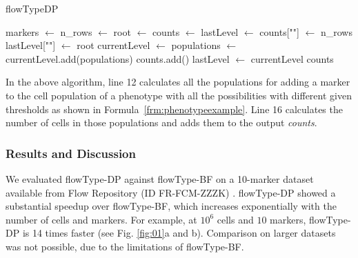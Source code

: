 \begin{algorithm}
\caption{flowTypeDP}
\label{fig:flowtypedpalg}
\begin{algorithmic}[1]
    \State markers $ \gets $ 
    \State n\_rows $ \gets $ 
    \State root $ \gets $ 
    \State counts $ \gets $ lastLevel $ \gets $ 
    \State counts[""] $ \gets $ n\_rows
    \State lastLevel[""] $ \gets $ root
        \State currentLevel $ \gets $ 
                \State populations $ \gets $ 
                \State currentLevel.add(populations)
            \EndFor
        \EndFor
        \State counts.add()
        \State lastLevel $ \gets $ currentLevel
    \EndFor
    \State \Return counts
\EndFunction
\end{algorithmic}
\end{algorithm}

In the above algorithm, line 12 calculates all the populations for adding a
marker to the cell population of a phenotype with all the possibilities with
different given thresholds as shown in Formula~\ref{frm:phenotypeexample}.
Line 16 calculates the number of cells in those populations and adds them to
the output \emph{counts}.

\subsubsection{Results and Discussion}
We evaluated flowType-DP against flowType-BF on a 10-marker dataset available from Flow Repository (ID FR-FCM-ZZZK) \cite{Aghaeepour2012}.
flowType-DP showed a substantial speedup over flowType-BF, which increases exponentially with the number of cells and markers. 
For example, at $10^6$ cells and $10$ markers, flowType-DP is 14 times faster (see Fig. \ref{fig:01}a and b). %
Comparison on larger datasets was not possible, due to the limitations of flowType-BF.

